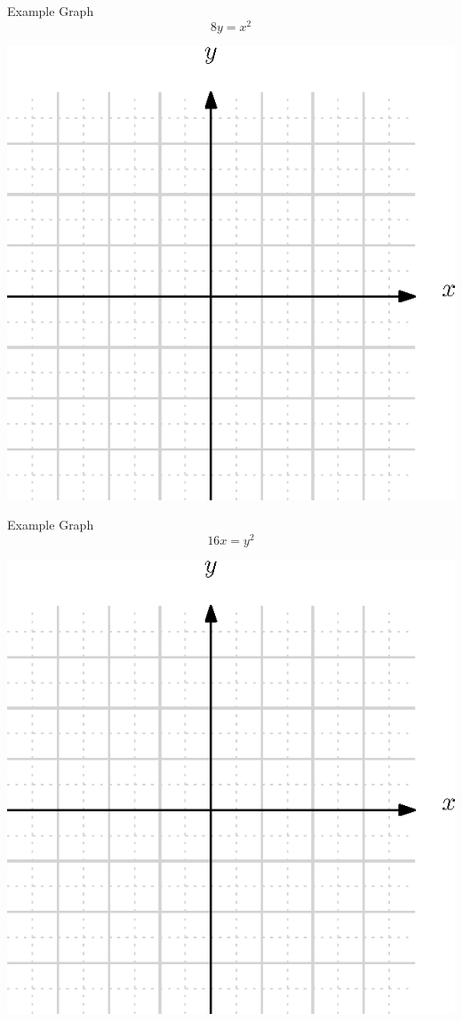 \documentclass[presentation]{beamer}
\begin{document}
\begin{frame}[label={sec:org27f86c3}]{Example}
Graph
\[
8y = x^2\]

\includegraphics[scale=0.9]{./blank_grid}
\vspace{10in}
\end{frame}


\begin{frame}[label={sec:org4c185e7}]{Example}
Graph
\[
16x = y^2\]

\includegraphics[scale=0.9]{./blank_grid}
\vspace{10in}
\end{frame}
\end{document}
